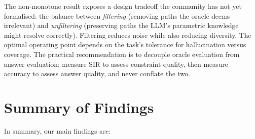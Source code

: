 The non-monotone result exposes a design tradeoff the community has not yet formalised: the balance between \textit{filtering} (removing paths the oracle deems irrelevant) and \textit{unfiltering} (preserving paths the LLM's parametric knowledge might resolve correctly). Filtering reduces noise while also reducing diversity. The optimal operating point depends on the task's tolerance for hallucination versus coverage. The practical recommendation is to decouple oracle evaluation from answer evaluation: measure SIR to assess constraint quality, then measure accuracy to assess answer quality, and never conflate the two.

\section{Summary of Findings}
\label{sec:ch5summary}

In summary, our main findings are:

